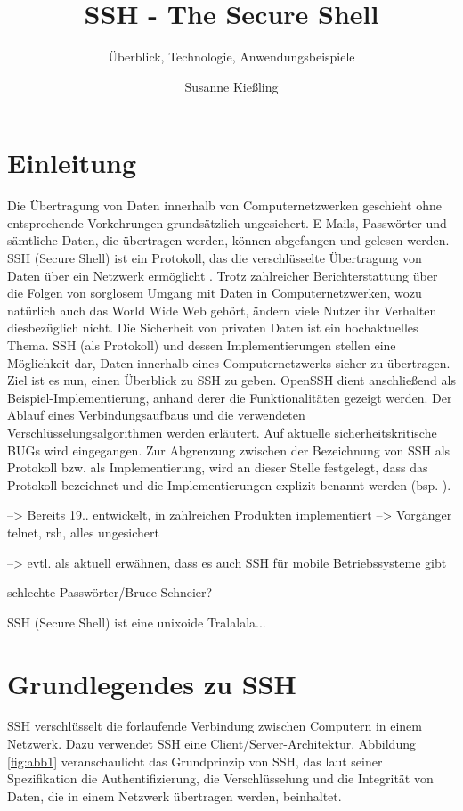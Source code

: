 \documentclass[ngerman,pdf]{wkcms}    %
\title{SSH - The Secure Shell}
\subtitle{Überblick, Technologie, Anwendungsbeispiele}
\author{Susanne Kießling}
\date{\todaylong}
\begin{document}
\maketitle


\section{Einleitung}

Die Übertragung von Daten innerhalb von Computernetzwerken geschieht ohne
entsprechende Vorkehrungen grundsätzlich ungesichert. E-Mails, Passwörter und sämtliche Daten, die übertragen werden, können abgefangen und gelesen werden. SSH (Secure Shell) ist ein Protokoll, das die verschlüsselte Übertragung von Daten über ein Netzwerk ermöglicht \cite{SSH}.
Trotz zahlreicher Berichterstattung über die Folgen von sorglosem Umgang mit Daten in Computernetzwerken, wozu natürlich auch das World Wide Web gehört, ändern viele Nutzer
ihr Verhalten diesbezüglich nicht. Die Sicherheit von privaten Daten ist ein hochaktuelles Thema. SSH (als Protokoll) und dessen Implementierungen stellen eine Möglichkeit dar, Daten innerhalb eines Computernetzwerks sicher zu übertragen. Ziel ist es nun, einen Überblick zu SSH zu geben. OpenSSH dient anschließend als Beispiel-Implementierung, anhand derer die Funktionalitäten gezeigt werden. Der Ablauf eines Verbindungsaufbaus und die verwendeten Verschlüsselungsalgorithmen werden erläutert. Auf aktuelle sicherheitskritische BUGs wird eingegangen. Zur Abgrenzung zwischen der Bezeichnung von SSH als Protokoll bzw. als Implementierung, wird an dieser Stelle festgelegt, dass  das Protokoll bezeichnet und die Implementierungen explizit benannt werden (bsp. ).

--> Bereits 19.. entwickelt, in zahlreichen Produkten implementiert
--> Vorgänger telnet, rsh, alles ungesichert

--> evtl. als aktuell erwähnen, dass es auch SSH für mobile Betriebssysteme gibt

 schlechte Passwörter/Bruce Schneier?

SSH (Secure Shell) ist eine unixoide Tralalala...



\newpage

\section{Grundlegendes zu SSH}


SSH verschlüsselt die forlaufende Verbindung zwischen Computern in einem Netzwerk. Dazu verwendet SSH eine Client/Server-Architektur. Abbildung \ref{fig:abb1} veranschaulicht das Grundprinzip von SSH, das laut seiner Spezifikation die Authentifizierung, die Verschlüsselung und die Integrität von Daten, die in einem Netzwerk übertragen werden, beinhaltet.
\end{document}

